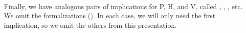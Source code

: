 \begin{code}%
\>[0]\<%
\\
\>[0][@{}l@{\AgdaIndent{1}}]%
\>[1]\AgdaSpace{}%
\AgdaSymbol{:}\AgdaSpace{}%
\AgdaSpace{}%
\AgdaSpace{}%
\AgdaSpace{}%
\AgdaSpace{}%
\AgdaSpace{}%
\AgdaSpace{}%
\AgdaSymbol{\{}\AgdaSpace{}%
\AgdaSymbol{=}\AgdaSpace{}%
\AgdaSymbol{\}\{}\AgdaSymbol{\}}\AgdaSpace{}%
\AgdaSpace{}%
\AgdaSpace{}%
\AgdaSpace{}%
\AgdaSpace{}%
\<%
\\
%
\>[1]\AgdaSpace{}%
\AgdaSpace{}%
\AgdaSpace{}%
\AgdaSymbol{(}\AgdaSpace{}%
\AgdaOperator{\AgdaInductiveConstructor{,}}\AgdaSpace{}%
\AgdaSpace{}%
\AgdaOperator{\AgdaInductiveConstructor{,}}\AgdaSpace{}%
\AgdaSymbol{)}\AgdaSpace{}%
\AgdaSymbol{=}\AgdaSpace{}%
\AgdaSymbol{\{}\AgdaSpace{}%
\AgdaSymbol{=}\AgdaSpace{}%
\AgdaSymbol{\}\{}\AgdaSymbol{\}}\AgdaSpace{}%
\AgdaSymbol{(}\AgdaSpace{}%
\AgdaSpace{}%
\AgdaSymbol{)}\AgdaSpace{}%
\<%
\\
%
\\[\AgdaEmptyExtraSkip]%
%
\>[1]\AgdaSpace{}%
\AgdaSymbol{:}\AgdaSpace{}%
\AgdaSpace{}%
\AgdaSpace{}%
\AgdaSpace{}%
\AgdaSpace{}%
\AgdaSpace{}%
\AgdaSpace{}%
\AgdaSpace{}%
\AgdaSpace{}%
\AgdaSpace{}%
\AgdaSpace{}%
\AgdaSpace{}%
\AgdaSpace{}%
\<%
\\
%
\>[1]\AgdaSpace{}%
\AgdaSpace{}%
\AgdaSpace{}%
\AgdaSpace{}%
\AgdaSymbol{=}\AgdaSpace{}%
\AgdaSpace{}%
\AgdaSpace{}%
\AgdaSymbol{(}\AgdaSpace{}%
\AgdaOperator{\AgdaInductiveConstructor{,}}\AgdaSpace{}%
\AgdaSymbol{(}\AgdaSpace{}%
\AgdaOperator{\AgdaInductiveConstructor{,}}\AgdaSpace{}%
\AgdaSymbol{))}\<%
\\
\>[0]\<%
\end{code}
Finally, we have analogous pairs of implications for \af P, \af H, and \af V,
  called , , , etc.
\ifshort
We omit the formalizations (\seeshort).
\else
In each case, we will only need the first implication, so we omit the others from this presentation.

